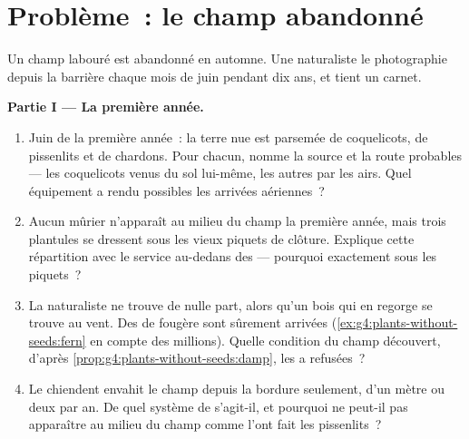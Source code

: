 \section{Problème~: le champ abandonné}

\begin{problem}\label{pb:g6:how-plants-spread:1}
Un champ labouré est abandonné en automne. Une naturaliste le
photographie depuis la barrière chaque mois de juin pendant dix ans,
et tient un carnet.

\medskip\noindent\textbf{Partie I --- La première année.}
\begin{enumerate}
  \item Juin de la première année~: la terre nue est parsemée de
        coquelicots, de pissenlits et de chardons. Pour chacun,
        nomme la source et la route probables --- les coquelicots
        venus du sol lui-même, les autres par les airs. Quel
        équipement a rendu possibles les arrivées aériennes~?
  \item Aucun mûrier n'apparaît au milieu du champ la première
        année, mais trois plantules se dressent sous les vieux
        piquets de clôture. Explique cette répartition avec le
        service au-dedans des  --- pourquoi exactement sous
        les piquets~?
  \item La naturaliste ne trouve de  nulle part, alors
        qu'un bois qui en regorge se trouve au vent.
        Des  de fougère sont sûrement arrivées
        (\cref{ex:g4:plants-without-seeds:fern} en compte des
        millions). Quelle condition du champ découvert, d'après
        \cref{prop:g4:plants-without-seeds:damp}, les a refusées~?
  \item Le chiendent envahit le champ depuis la bordure seulement,
        d'un mètre ou deux par an. De quel système de 
        s'agit-il, et pourquoi ne peut-il pas apparaître au milieu
        du champ comme l'ont fait les pissenlits~?
\end{enumerate}


\end{problem}
